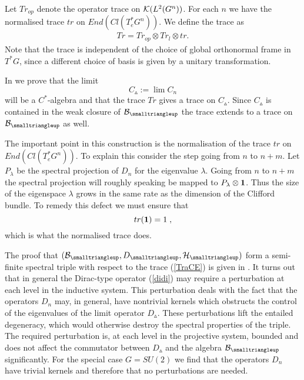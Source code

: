 \documentclass[12pt]{article}
\newcommand{\ba}{\begin{eqnarray}}
\newcommand{\ea}{\end{eqnarray}}
\def\cb{{\cal B}}
\def\ch{{\cal H}}
\def\ck{{\cal K}}
\begin{document}
Let $Tr_{op}$ denote the operator trace on $\ck (L^2(G^n ))$. For each $n$ we have the normalised trace $tr$ on $End (Cl(T^*_e G^n)).$ 
We define the trace as
\ba 
Tr = Tr_{op}\otimes Tr_l\otimes tr.
\label{TraCE}
\ea
Note that the trace is independent of the choice of global orthonormal frame  in $T^*G$, since a different choice of basis is given by a unitary transformation.



In \cite{Aastrup} we prove that the limit $$C_{\smalltriangleup}:=\lim C_{n}$$ will be a $C^*$-algebra and that the trace $Tr$ gives a trace on $C_{\smalltriangleup}$. Since $C_{\smalltriangleup}$ is contained in the weak closure of $\cb_{\smalltriangleup}$ the trace extends to a trace on $\cb_{\smalltriangleup}$ as well.




The important point in this construction is the normalisation of the trace $tr$ on $End (Cl(T^*_e G^n))$. To explain this consider the step going from $n$ to $n+m$. 
Let $P_\lambda$ be the spectral projection of $D_n$ for the eigenvalue $\lambda$. Going from $n$ to $n+m$ the spectral projection will roughly speaking be mapped to $P_\lambda\otimes \bf{1}$. Thus the size of the eigenspace $\lambda$ grows in the same rate as the dimension of the Clifford bundle. To remedy this defect we must ensure that $$tr ({\bf 1})=1\;,$$ 
which is what the normalised trace does.









The proof that $(\cb_{\smalltriangleup},D_{\smalltriangleup},\ch_\smalltriangleup)$ form a semi-finite spectral triple with respect to the trace (\ref{TraCE})
is given in \cite{Aastrup}. 
 It turns out that in general the Dirac-type operator (\ref{didi}) may require a perturbation at each level in the inductive system. This perturbation deals with the fact that the operators $D_n$ may, in general, have nontrivial kernels which obstructs the control of the eigenvalues of the limit operator $D_{\smalltriangleup}$. These perturbations lift the entailed degeneracy, which would otherwise destroy the spectral properties of the triple. 
The required perturbation is, at each level in the projective system, bounded and does not affect the commutator between $D_{\smalltriangleup}$ and the algebra $\cb_{\smalltriangleup}$ significantly. For the special case $G=SU(2)$ we find that the operators $D_n$ have trivial kernels and therefore that no perturbations are needed.\\
\end{document}
